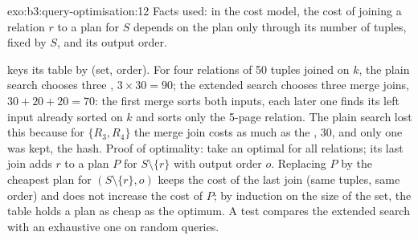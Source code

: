 \begin{solution}{exo:b3:query-optimisation:12}
Facts used: in the cost model, the cost of joining a relation $r$ to a plan for $S$ depends on the plan only through its number of tuples, fixed by $S$, and its output order.

 keys its table by (set, order). For four relations of 50 tuples joined on $k$, the plain search chooses three , $3 \times 30 = 90$; the extended search chooses three merge joins, $30 + 20 + 20 = 70$: the first merge sorts both inputs, each later one finds its left input already sorted on $k$ and sorts only the 5-page relation. The plain search lost this because for $\{R_3, R_4\}$ the merge join costs as much as the , 30, and only one was kept, the hash. Proof of optimality: take an optimal  for all relations; its last join adds $r$ to a plan $P$ for $S \setminus \{r\}$ with output order $o$. Replacing $P$ by the cheapest plan for $(S \setminus \{r\}, o)$ keeps the cost of the last join (same tuples, same order) and does not increase the cost of $P$; by induction on the size of the set, the table holds a plan as cheap as the optimum. A test compares the extended search with an exhaustive one on random queries.
\end{solution}

